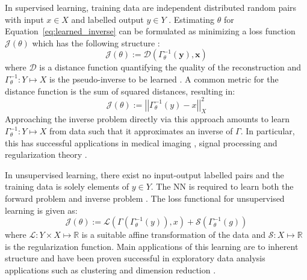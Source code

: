 In supervised learning, training data are independent distributed random pairs with input $x\in X$ and labelled output $y \in Y$ \citep{Vito2005}. Estimating $\theta$ for Equation~\ref{eq:learned_inverse} can be formulated as minimizing a loss function $\mathcal{J}(\theta)$ which has the following structure \citep{Adler2017a}:
\begin{equation}\label{eq:supervised_learning}
	\mathcal{J}(\theta) := \mathcal{D}(\Gamma_\theta^{-1}(\boldsymbol{y}), \boldsymbol{x})
\end{equation}
where $\mathcal{D}$ is a distance function quantifying the quality of the reconstruction and $\Gamma_\theta^{-1}:Y\mapsto X$ is the pseudo-inverse to be learned \citep{Adler2017a}. A common metric for the distance function is the sum of squared distances, resulting in:
\begin{equation}
\mathcal{J}(\theta) := \left|\left|\Gamma_\theta^{-1}(y)- x\right|\right|_X^2
\end{equation}
Approaching the inverse problem directly via this approach amounts to learn $\Gamma_\theta^{-1}:Y\mapsto X$ from data such that it approximates an inverse of $\Gamma$. In particular, this has successful applications in medical imaging \citep{Xu2012, Lucas2018}, signal processing \citep{Rusu2017, Dokmanic2016} and regularization theory \citep{Meinhardt2017, Romano2016, DelosReyes2017}.

In unsupervised learning, there exist no input-output labelled pairs and the training data is solely elements of $y\in Y$. The \ac{NN} is required to learn both the forward problem and inverse problem \citep{Andrychowicz2016}. The loss functional for unsupervised learning is given as:
\begin{equation}
	\mathcal{J}(\theta) := \mathcal{L}\left(\Gamma\left(\Gamma_\theta^{-1}(y)\right),x \right)+\mathcal{S}\left(\Gamma_\theta^{-1}(g)\right)
\end{equation}
where $\mathcal{L}:Y\times X \mapsto\mathbb{R}$ is a suitable affine transformation of the data and $\mathcal{S}:X\mapsto \mathbb{R}$ is the regularization function. Main applications of this learning are to inherent structure and have been proven successful in exploratory data analysis applications such as clustering \citep{Sever2015,Gerdova2002} and dimension reduction \citep{Dolenko2015}.

